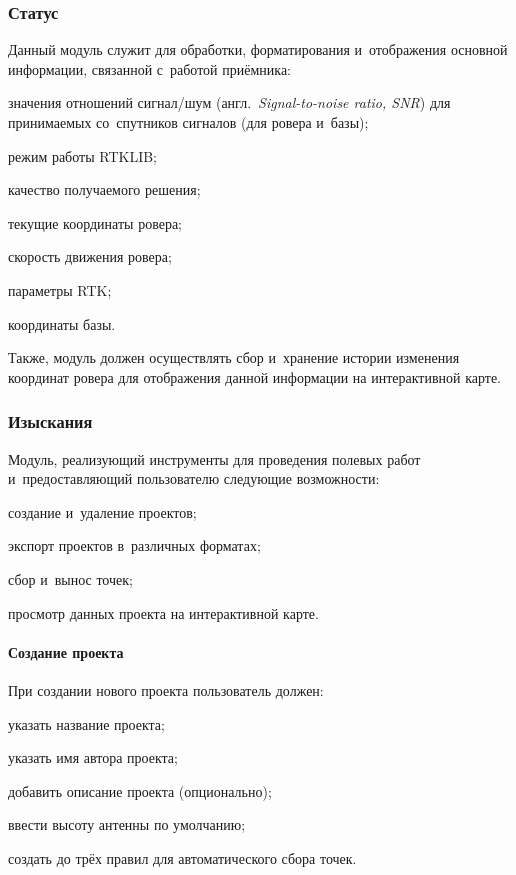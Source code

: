 \subsubsection{Статус}

Данный модуль служит для обработки, форматирования и~отображения основной информации, связанной с~работой приёмника:
\begin{dashitemize}
  \item значения отношений сигнал/шум (англ.~\emph{Signal-to-noise ratio, SNR}) для принимаемых со~спутников сигналов (для ровера и~базы);
  \item режим работы RTKLIB;
  \item качество получаемого решения;
  \item текущие координаты ровера;
  \item скорость движения ровера;
  \item параметры RTK;
  \item координаты базы.
\end{dashitemize}

Также, модуль должен осуществлять сбор и~хранение истории изменения координат ровера для отображения данной информации на интерактивной карте.


\subsubsection{Изыскания}

Модуль, реализующий инструменты для проведения полевых работ и~предоставляющий пользователю следующие возможности:
\begin{dashitemize}
  \item создание и~удаление проектов;
  \item экспорт проектов в~различных форматах;
  \item сбор и~вынос точек;
  \item просмотр данных проекта на интерактивной карте.
\end{dashitemize}

\paragraph{Создание проекта}

При создании нового проекта пользователь должен:
\begin{dashitemize}
  \item указать название проекта;
  \item указать имя автора проекта;
  \item добавить описание проекта (опционально);
  \item ввести высоту антенны по умолчанию;
  \item создать до трёх правил для автоматического сбора точек.
\end{dashitemize}

